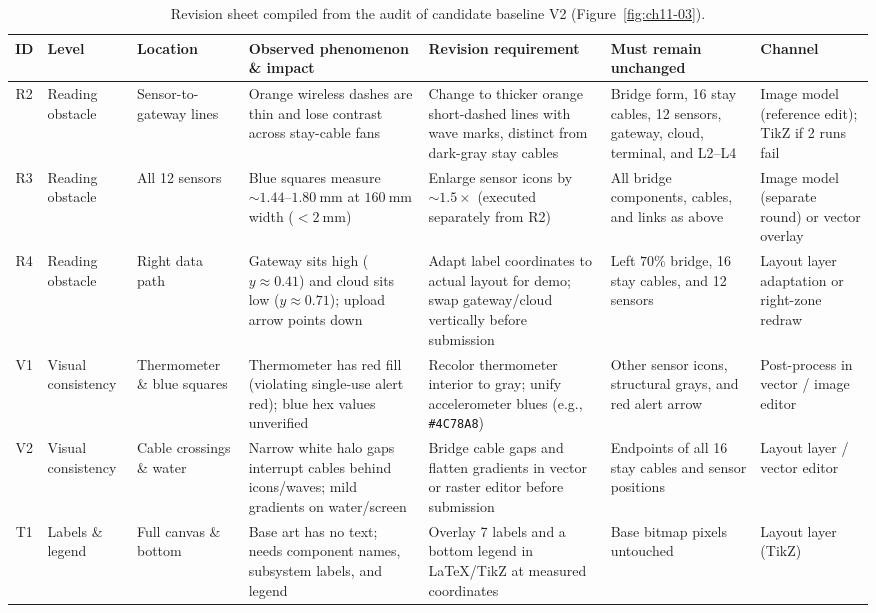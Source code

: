 \begin{table}[htbp]\centering\scriptsize
\setlength{\tabcolsep}{3pt}
\renewcommand{\arraystretch}{1.08}
\caption{Revision sheet compiled from the audit of candidate baseline V2 (Figure~\ref{fig:ch11-03}).}\label{tab:ch11-03}
\begin{tabularx}{\linewidth}{@{}c>{\raggedright\arraybackslash}p{14mm}>{\raggedright\arraybackslash}p{18mm}YYY>{\raggedright\arraybackslash}p{18mm}@{}}
\toprule
\textbf{ID} & \textbf{Level} & \textbf{Location} & \textbf{Observed phenomenon \& impact} & \textbf{Revision requirement} & \textbf{Must remain unchanged} & \textbf{Channel} \\
\midrule
R2 & Reading obstacle & Sensor-to-gateway lines & Orange wireless dashes are thin and lose contrast across stay-cable fans & Change to thicker orange short-dashed lines with wave marks, distinct from dark-gray stay cables & Bridge form, 16 stay cables, 12 sensors, gateway, cloud, terminal, and L2--L4 & Image model (reference edit); TikZ if 2 runs fail \\
R3 & Reading obstacle & All 12 sensors & Blue squares measure $\sim 1.44\text{--}1.80\ \text{mm}$ at $160\ \text{mm}$ width ($<2\ \text{mm}$) & Enlarge sensor icons by $\sim 1.5\times$ (executed separately from R2) & All bridge components, cables, and links as above & Image model (separate round) or vector overlay \\
R4 & Reading obstacle & Right data path & Gateway sits high ($y\approx 0.41$) and cloud sits low ($y\approx 0.71$); upload arrow points down & Adapt label coordinates to actual layout for demo; swap gateway/cloud vertically before submission & Left $70\%$ bridge, 16 stay cables, and 12 sensors & Layout layer adaptation or right-zone redraw \\
V1 & Visual consistency & Thermometer \& blue squares & Thermometer has red fill (violating single-use alert red); blue hex values unverified & Recolor thermometer interior to gray; unify accelerometer blues (e.g., \texttt{\#4C78A8}) & Other sensor icons, structural grays, and red alert arrow & Post-process in vector / image editor \\
V2 & Visual consistency & Cable crossings \& water & Narrow white halo gaps interrupt cables behind icons/waves; mild gradients on water/screen & Bridge cable gaps and flatten gradients in vector or raster editor before submission & Endpoints of all 16 stay cables and sensor positions & Layout layer / vector editor \\
T1 & Labels \& legend & Full canvas \& bottom & Base art has no text; needs component names, subsystem labels, and legend & Overlay 7 labels and a bottom legend in LaTeX/TikZ at measured coordinates & Base bitmap pixels untouched & Layout layer (TikZ) \\
\bottomrule
\end{tabularx}
\end{table}

